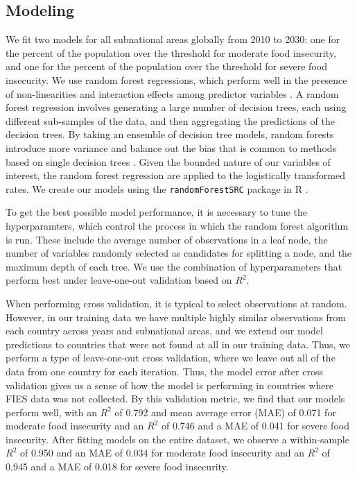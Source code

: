 \documentclass[titlepage]{article}
\begin{document}
\subsection{Modeling}
We fit two models for all subnational areas globally from 2010 to 2030: one for the percent of the population over the threshold for moderate food insecurity, and one for the percent of the population over the threshold for severe food insecurity.  We use random forest regressions, which perform well in the presence of non-linearities and interaction effects among predictor variables \citep{hastie2009elements}.  A random forest regression involves generating a large number of decision trees, each using different sub-samples of the data, and then aggregating the predictions of the decision trees.  By taking an ensemble of decision tree models, random forests introduce more variance and balance out the bias that is common to methods based on single decision trees \citep{friedman2001elements}. Given the bounded nature of our variables of interest, the random forest regression are applied to the logistically transformed rates.  We create our models using the \texttt{randomForestSRC} package in R \citep{ishwaran2019randomforestsrc}.

To get the best possible model performance, it is necessary to tune the hyperparamters, which control the process in which the random forest algorithm is run.  These include the average number of observations in a leaf node, the number of variables randomly selected as candidates for splitting a node, and the maximum depth of each tree.  We use the combination of hyperparameters that perform best under leave-one-out validation based on $R^2$.

When performing cross validation, it is typical to select observations at random.  However, in our training data we have multiple highly similar observations from each country across years and subnational areas, and we extend our model predictions to countries that were not found at all in our training data.  Thus, we perform a type of leave-one-out cross validation, where we leave out all of the data from one country for each iteration.  Thus, the model error after cross validation gives us a sense of how the model is performing in countries where FIES data was not collected.  By this validation metric, we find that our models perform well, with an $R^2$ of 0.792 and mean average error (MAE) of 0.071 for moderate food insecurity and an $R^2$ of 0.746 and a MAE of 0.041 for severe food insecurity.  After fitting models on the entire dataset, we observe a within-sample $R^2$ of 0.950 and an MAE of 0.034 for moderate food insecurity and an $R^2$ of 0.945 and a MAE of 0.018 for severe food insecurity.
\end{document}
